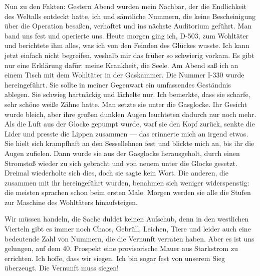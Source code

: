 Nun zu den Fakten: Gestern Abend wurden mein Nachbar, der die
Endlichkeit des Weltalls entdeckt hatte, ich und sämtliche Nummern,
die keine Bescheinigung über die Operation besaßen, verhaftet und
ins nächste Auditorium geführt. Man band uns fest und operierte
uns. Heute morgen ging ich, D-503, zum Wohltäter und berichtete ihm
alles, was ich von den Feinden des Glückes wusste. Ich kann jetzt
einfach nicht begreifen, weshalb mir das früher so schwierig
vorkam. Es gibt nur eine Erklärung dafür: meine Krankheit, die
Seele. Am Abend saß ich an einem Tisch mit dem Wohltäter in der
Gaskammer. Die Nummer I-330 wurde hereingeführt. Sie sollte in
meiner Gegenwart ein umfassendes Geständnis ablegen. Sie schwieg
hartnäckig und lächelte nur. Ich bemerkte, dass sie scharfe, sehr
schöne weiße Zähne hatte. Man setzte sie unter die Gasglocke. Ihr
Gesicht wurde bleich, aber ihre großen dunklen Augen leuchteten
dadurch nur noch mehr. Als die Luft aus der Glocke gepumpt wurde,
warf sie den Kopf zurück, senkte die Lider und presste die Lippen
zusammen — das erinnerte mich an irgend etwas. Sie hielt sich
krampfhaft an den Sessellehnen fest und blickte mich an, bis ihr
die Augen zufielen. Dann wurde sie aus der Gasglocke herausgeholt,
durch einen Stromstoß wieder zu sich gebracht und von neuem unter
die Glocke gesetzt. Dreimal wiederholte sich dies, doch sie sagte
kein Wort. Die anderen, die zusammen mit ihr hereingeführt wurden,
benahmen sich weniger widerspenstig: die meisten sprachen schon
beim ersten Male. Morgen werden sie alle die Stufen zur Maschine
des Wohltäters hinaufsteigen.

Wir müssen handeln, die Sache duldet keinen Aufschub, denn in den
westlichen Vierteln gibt es immer noch Chaos, Gebrüll, Leichen,
Tiere und leider auch eine bedeutende Zahl von Nummern, die die
Vernunft verraten haben. Aber es ist uns gelungen, auf dem 40.
Prospekt eine provisorische Mauer aus Starkstrom zu errichten. Ich
hoffe, dass wir siegen. Ich bin sogar fest von unserem Sieg
überzeugt. Die Vernunft muss siegen!


